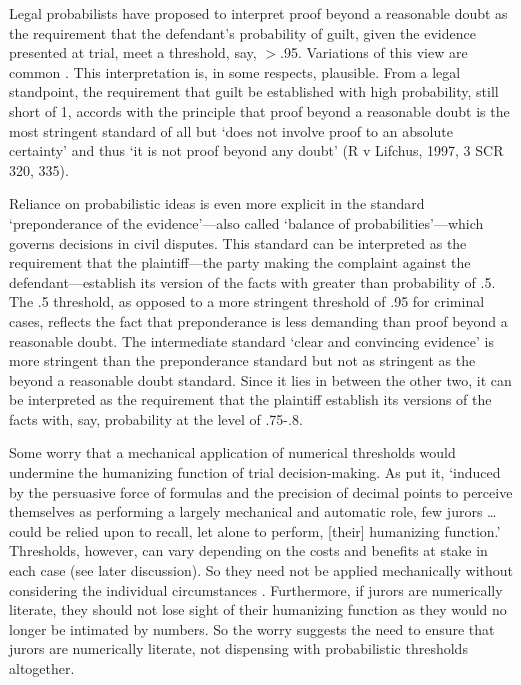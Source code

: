 \documentclass{article}
\begin{document}
Legal probabilists have proposed to interpret proof beyond a reasonable 
doubt as the requirement that the defendant's probability of guilt, given the evidence presented at trial, meet a threshold, say, $>$.95. Variations of this view are common  \citep[see, for exmaple,][]{Bernoulli1713Ars-conjectandi, Laplace1814,  kaplan1968decision, Dekay1996, kaye79, laudan2006truth}. This interpretation is, in some respects, plausible. %
From a legal standpoint, the requirement that guilt be established with high probability, still short of 1, accords with the  principle that proof beyond a reasonable doubt is the most stringent standard of all but %
`does not involve proof to an absolute certainty' and thus `it is not proof beyond any doubt' (R v Lifchus, 1997, 3 SCR 320, 335).



Reliance on probabilistic ideas is even more explicit in the standard `preponderance of the evidence'---also called `balance of probabilities'---which governs decisions in civil disputes. This standard can be interpreted as the requirement that the plaintiff---the party making the complaint against the defendant---establish its version of the facts with greater than probability of .5. The .5 threshold, as opposed to a more stringent threshold of .95 for criminal cases, reflects the fact that  preponderance is less demanding than proof beyond a reasonable doubt. The intermediate standard `clear and convincing evidence' is more stringent than the preponderance standard but not as stringent as the beyond a reasonable doubt standard. Since it lies in between the other two, it can be interpreted as the requirement that the plaintiff establish its versions of the facts with, say, probability at the level of .75-.8.

Some worry that a mechanical application of numerical thresholds would undermine the humanizing function of trial decision-making. %
As \cite{tribe71} put it, `induced by the persuasive force of formulas and the precision of  decimal  points  to  perceive  themselves  as  performing  a  largely mechanical and automatic  role, few jurors \dots could be relied upon to recall, let alone to perform, [their] humanizing function.' 
Thresholds, however, can vary depending on the costs and benefits at stake in each case (see later discussion). So they need not be applied mechanically without considering the individual circumstances  \citep{HeddenColyvan2019legal}. Furthermore, if jurors are numerically literate, they should not lose sight of their humanizing function as they would no longer be intimated by numbers. So the worry suggests the need to ensure that jurors are numerically literate, not dispensing with probabilistic thresholds altogether. 
\end{document}
